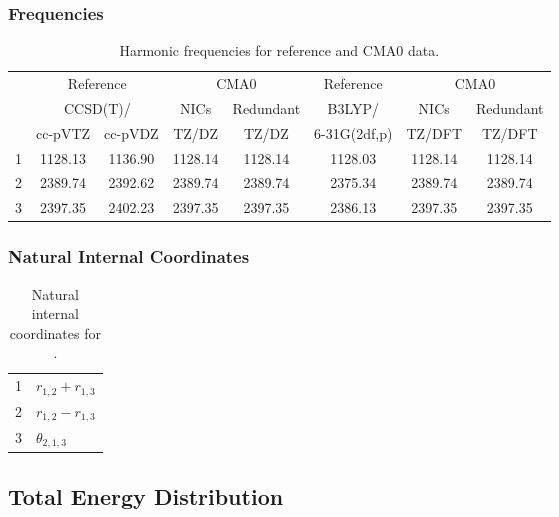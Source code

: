 \documentclass[10pt,oneside]{article}
\begin{document}
\begin{table}[h!]
\subsubsection*{Frequencies}
\centering
\caption{Harmonic frequencies for reference and CMA0 data.}
\begin{tabular}{cccccccc}
\toprule
{} & \multicolumn{2}{c}{Reference} & \multicolumn{2}{c}{CMA0} &    Reference & \multicolumn{2}{c}{CMA0} \\
{} & \multicolumn{2}{c}{CCSD(T)/} &    NICs &  Redundant &       B3LYP/ &    NICs & Redundant \\
{} &   cc-pVTZ & cc-pVDZ &   TZ/DZ &      TZ/DZ & 6-31G(2df,p) &  TZ/DFT &    TZ/DFT \\
\midrule
1 &   1128.13 & 1136.90 & 1128.14 &    1128.14 &      1128.03 & 1128.14 &   1128.14 \\
2 &   2389.74 & 2392.62 & 2389.74 &    2389.74 &      2375.34 & 2389.74 &   2389.74 \\
3 &   2397.35 & 2402.23 & 2397.35 &    2397.35 &      2386.13 & 2397.35 &   2397.35 \\
\bottomrule
\end{tabular}
\end{table}

\begin{table}[h!]
\subsubsection*{Natural Internal Coordinates}
\centering
\caption{Natural internal coordinates for .}
\small
\begin{tabular}{ll}
\toprule
  1   & $r_{1,2} + r_{1,3}$ \\
  2   & $r_{1,2} - r_{1,3}$ \\
  3   & $\theta_{2,1,3}$ \\
\bottomrule
\end{tabular}
\end{table}

\begin{table}
\subsection*{Total Energy Distribution}
\centering\end{table}

\clearpage

\subsection{}
\end{document}
